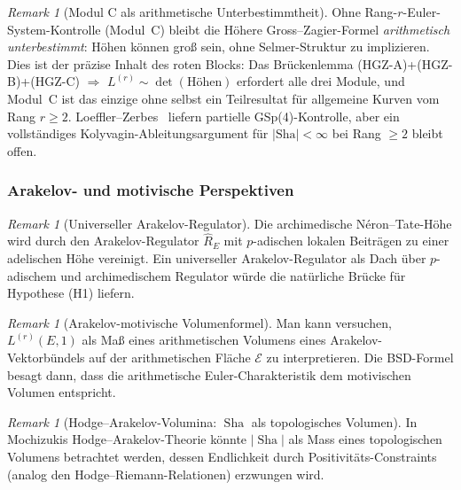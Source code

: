 \documentclass[aps,prd,twocolumn,superscriptaddress,nofootinbib,floatfix]{revtex4-2}
\theoremstyle{definition}
\theoremstyle{remark}
\newtheorem{remark}[theorem]{Remark}
\DeclareMathOperator{\Sha}{Sha}
\begin{document}
\begin{remark}[Modul C als arithmetische Unterbestimmtheit]\label{rem:module-c-underdetermined}
Ohne Rang-$r$-Euler-System-Kontrolle (Modul~C) bleibt die Höhere Gross--Zagier-Formel \emph{arithmetisch unterbestimmt}: Höhen können groß sein, ohne Selmer-Struktur zu implizieren. Dies ist der präzise Inhalt des roten Blocks: Das Brückenlemma (HGZ-A)+(HGZ-B)+(HGZ-C) $\Rightarrow$ $L^{(r)} \sim \det(\text{Höhen})$ erfordert alle drei Module, und Modul~C ist das einzige ohne selbst ein Teilresultat für allgemeine Kurven vom Rang $r \geq 2$. Loeffler--Zerbes~\cite{LoefflerZerbes2024} liefern partielle GSp(4)-Kontrolle, aber ein vollständiges Kolyvagin-Ableitungsargument für $|\mathrm{Sha}| < \infty$ bei Rang $\geq 2$ bleibt offen.
\end{remark}

\subsubsection{Arakelov- und motivische Perspektiven}

\begin{remark}[Universeller Arakelov-Regulator]
\label{rem:arakelov-regulator}
Die archimedische Néron--Tate-Höhe wird durch den Arakelov-Regulator $\hat{R}_E$ mit $p$-adischen lokalen Beiträgen zu einer adelischen Höhe vereinigt. Ein \glqq universeller Arakelov-Regulator\grqq{} als Dach über $p$-adischem und archimedischem Regulator würde die natürliche Brücke für Hypothese (H1) liefern.
\end{remark}

\begin{remark}[Arakelov-motivische Volumenformel]
\label{rem:arakelov-volume}
Man kann versuchen, $L^{(r)}(E,1)$ als Maß eines \glqq arithmetischen Volumens\grqq{} eines Arakelov-Vektorbündels auf der arithmetischen Fläche $\mathcal{E}$ zu interpretieren. Die BSD-Formel besagt dann, dass die arithmetische Euler-Charakteristik dem motivischen Volumen entspricht.
\end{remark}

\begin{remark}[Hodge--Arakelov-Volumina: $\Sha$ als topologisches Volumen]
\label{rem:hodge-arakelov-sha}
In Mochizukis Hodge--Arakelov-Theorie könnte $|\Sha|$ als Mass eines topologischen Volumens betrachtet werden, dessen Endlichkeit durch Positivitäts-Constraints (analog den Hodge--Riemann-Relationen) erzwungen wird.
\end{remark}
\end{document}
